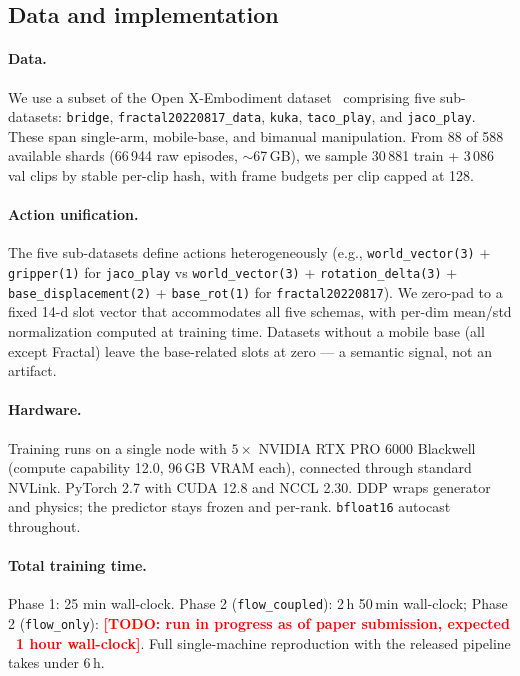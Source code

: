 \documentclass[10pt,letterpaper]{article}
\newcommand{\TODO}[1]{\textcolor{red}{\textbf{[TODO: #1]}}}
\begin{document}
\subsection{Data and implementation}\label{sec:data}

\paragraph{Data.} We use a subset of the Open X-Embodiment dataset~\citep{oxe_2023} comprising five sub-datasets: \texttt{bridge}, \texttt{fractal20220817\_data}, \texttt{kuka}, \texttt{taco\_play}, and \texttt{jaco\_play}. These span single-arm, mobile-base, and bimanual manipulation. From 88 of 588 available shards (66\,944 raw episodes, $\sim$67\,GB), we sample 30\,881 train + 3\,086 val clips by stable per-clip hash, with frame budgets per clip capped at 128.

\paragraph{Action unification.} The five sub-datasets define actions heterogeneously (e.g., \texttt{world\_vector(3)} + \texttt{gripper(1)} for \texttt{jaco\_play} vs \texttt{world\_vector(3)} + \texttt{rotation\_delta(3)} + \texttt{base\_displacement(2)} + \texttt{base\_rot(1)} for \texttt{fractal20220817}). We zero-pad to a fixed 14-d slot vector that accommodates all five schemas, with per-dim mean/std normalization computed at training time. Datasets without a mobile base (all except Fractal) leave the base-related slots at zero --- a semantic signal, not an artifact.

\paragraph{Hardware.} Training runs on a single node with $5\times$ NVIDIA RTX PRO 6000 Blackwell (compute capability 12.0, 96\,GB VRAM each), connected through standard NVLink. PyTorch 2.7 with CUDA 12.8 and NCCL 2.30. DDP wraps generator and physics; the predictor stays frozen and per-rank. \texttt{bfloat16} autocast throughout.

\paragraph{Total training time.} Phase 1: 25 min wall-clock. Phase 2 (\texttt{flow\_coupled}): 2\,h 50\,min wall-clock; Phase 2 (\texttt{flow\_only}): \TODO{run in progress as of paper submission, expected ~1 hour wall-clock}. Full single-machine reproduction with the released pipeline takes under 6\,h.
\end{document}
